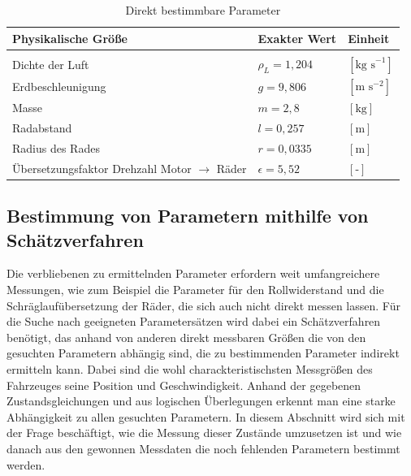 \begin{table}[H]
\centering
\begin{tabularx}{\columnwidth}{p{8cm}|p{4cm}|p{4cm}}
  \textbf{Physikalische Größe} & \textbf{Exakter Wert}& \textbf{Einheit}\\\hline\hline 
	\rule{0pt}{1mm} & &\\
	Dichte der Luft & $\rho_{L}=1,204$ & $[\text{kg s}^{-1} ]$\\
	Erdbeschleunigung& $g=9,806$ & $[\text{m s}^{-2}]$\\
	Masse& $m=2,8$ & $[\text{kg}]$\\
  	Radabstand& $l=0,257$ & $[\text{m}]$\\
	Radius des Rades & $r=0,0335$ & $[\text{m}]$\\
	Übersetzungsfaktor Drehzahl Motor $\rightarrow$ Räder  & $\epsilon=5,52$ & $[\text{-}]$
\end{tabularx}
\caption{Direkt bestimmbare Parameter \label{tab:Pardir}}
\end{table} 
\subsection{Bestimmung von Parametern mithilfe von Schätzverfahren}
Die verbliebenen zu ermittelnden Parameter erfordern weit umfangreichere Messungen, wie zum Beispiel die Parameter für den Rollwiderstand und die Schräglaufübersetzung der Räder, die sich auch nicht direkt messen lassen. Für die Suche nach geeigneten Parametersätzen wird dabei ein Schätzverfahren benötigt, das anhand von anderen direkt messbaren Größen die von den gesuchten Parametern abhängig sind, die zu bestimmenden Parameter indirekt ermitteln kann. Dabei sind die wohl charackteristischsten Messgrößen des Fahrzeuges seine Position und Geschwindigkeit. Anhand der gegebenen Zustandsgleichungen und aus logischen Überlegungen erkennt man eine starke Abhängigkeit zu allen gesuchten Parametern. In diesem Abschnitt wird sich mit der Frage beschäftigt, wie die Messung dieser Zustände umzusetzen ist und wie danach aus den gewonnen Messdaten die noch fehlenden Parametern bestimmt werden.
